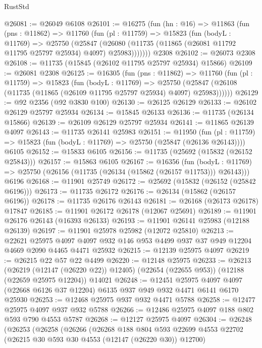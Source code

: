 \begin{lexlean}{RustStd}
\begin{coremodule}
@26081 := @26049 @6108
@26101 := @16275
    (fun (hn : @16) =>
    @11863
      (fun (pns : @11862) =>
      @11760
        (fun (pl : @11759) =>
        @15823
          (fun (bodyL : @11769) =>
          @25750
            (@25847
              (@26080 (@11735 (@11865 (@26081 @11792 @11795 @25797 @25934) @4097) @25983)))))))
    @2308
@26102 := @26073 @2308
@26108 := @11735 (@15845 (@26102 @11795 @25797 @25934) @15866)
@26109 := @26081 @2308
@26125 := @16305
    (fun (pns : @11862) =>
    @11760
      (fun (pl : @11759) =>
      @15823
        (fun (bodyL : @11769) =>
        @25750 (@25847 (@26108 (@11735 (@11865 (@26109 @11795 @25797 @25934) @4097) @25983))))))
@26129 := @92 @2356 (@92 @3830 @100)
@26130 := @26125 @26129
@26133 := @26102 @26129 @25797 @25934
@26134 := @15845 @26133
@26136 := @11735 (@26134 @15866)
@26139 := @26109 @26129 @25797 @25934
@26141 := @11865 @26139 @4097
@26143 := @11735 @26141 @25983
@26151 := @11950
    (fun (pl : @11759) => @15823 (fun (bodyL : @11769) => @25750 (@25847 (@26136 @26143))))
    @6105
@26152 := @15833 @6105
@26156 := @11735 (@25692 (@15832 (@26152 @25843)))
@26157 := @15863 @6105
@26167 := @16356
    (fun (bodyL : @11769) => @25750 (@26156 (@11735 (@26134 (@15862 (@26157 @11753))) @26143)))
    @6196
@26168 := @11901 @25749
@26172 := @25692 (@15832 (@26152 (@25842 @6196)))
@26173 := @11735 @26172
@26176 := @26134 (@15862 (@26157 @6196))
@26178 := @11735 @26176 @26143
@26181 := @26168 (@26173 @26178) @17847
@26185 := @11901 @26172 @26178 (@12067 @25691)
@26189 := @11901 @26176 @26143 (@16393 @26133)
@26193 := @11901 @26141 @25983 (@12188 @26139)
@26197 := @11901 @25978 @25982 (@12072 @25810)
@26213 := @22621
    @25975
    @4097
    @4097
    @932
    @146
    @953
    @4499
    @937
    @37
    @949
    @12204
    @4669
    @2090
    @4465
    @4471
    @25932
@26215 := @12139 @25975 @4097
@26219 := @26215 @22 @57 @22 @4499
@26220 := @12148 @25975
@26233 := @26213
    (@26219 (@12147 (@26220 @22)) @12405)
    (@22654 (@22655 @953))
    (@12188 (@22659 @25975 @12204))
    @14021
@26248 := @12451
    @25975
    @4097
    @4097
    (@22668 @6126 @37 @12204)
    @6135
    @937
    @949
    @932
    @4471
    @6141
    @6170
    @25930
@26253 := @12468 @25975 @937 @932 @4471 @5788
@26258 := @12477 @25975 @4097 @937 @932 @5788
@26266 := @12486 @25975 @4097 @188 @802 @593 @790 @4553 @5787
@26268 := @12127 @25975 @4097
@26304 := @26248
    (@26253
      (@26258
        (@26266
          (@26268
            @188
            @804
            @593
            @22699
            @4553
            @22702
            (@26215 @30 @593 @30 @4553 (@12147 (@26220 @30)) @12700)

\end{coremodule}
\end{lexlean}
